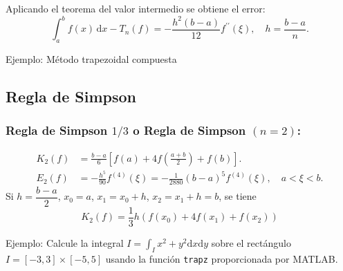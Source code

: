 \documentclass[11pt]{article}
\newenvironment{Shaded}{}{}
\newcommand{\FloatTok}[1]{\textcolor[rgb]{0.25,0.63,0.44}{{#1}}}
\newcommand{\CommentTok}[1]{\textcolor[rgb]{0.38,0.63,0.69}{\textit{{#1}}}}
\newcommand{\NormalTok}[1]{{#1}}
\begin{document}
    

    Aplicando el teorema del valor intermedio se obtiene el error: \[
\int_{a}^{b}\!\!f(x)\,\mathrm{d}x-T_n(f)=-\frac{h^2(b-a)}{12}f^{\prime\prime}\left(\xi\right),\quad h=\frac{b-a}{n}.
\]

    Ejemplo: Método trapezoidal compuesta

\begin{Shaded}
\end{Shaded}

    \hypertarget{regla-de-simpson}{%
\subsection{Regla de Simpson}\label{regla-de-simpson}}

\hypertarget{regla-de-simpson-13-o-regla-de-simpson-n2}{%
\subsubsection{\texorpdfstring{Regla de Simpson \(1/3\) o Regla de
Simpson
\((n=2)\):}{Regla de Simpson 1/3 o Regla de Simpson (n=2):}}\label{regla-de-simpson-13-o-regla-de-simpson-n2}}

\[
\begin{align*}
K_2(f)&=\frac{b-a}{6}\left[f(a) + 4f\left(\frac{a+b}{2}\right) + f(b)\right].\\
E_2(f)&=-\frac{h^5}{90}f^{(4)}\left(\xi\right)=-\frac{1}{2880}{\left(b-a\right)}^{5}f^{(4)}\left(\xi\right),\quad a<\xi<b.
\end{align*}
\] Si \(h=\dfrac{b-a}{2}\), \(x_0=a\), \(x_1=x_0+h\), \(x_2=x_1+h=b\),
se tiene \[
K_2(f)=\frac{1}{3}h\left(f(x_0)+4f(x_1)+f(x_2)\right)
\]

    Ejemplo: Calcule la integral \(I=\int_{I}x^2+y^2\mathrm{d}x\mathrm{d}y\)
sobre el rectángulo \(I=\left[-3,3\right]\times\left[-5,5\right]\)
usando la función \texttt{trapz} proporcionada por MATLAB.
\end{document}
